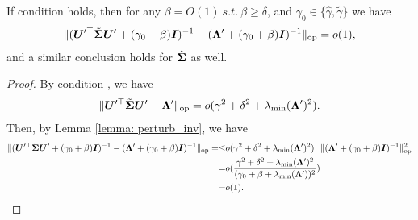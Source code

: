 \begin{lemma}\label{lemma: concentration_inv}
If condition \conc{} holds, then for any $\beta=O(1)~s.t.~\beta\geq \delta$, and $\gamma_0\in\{ \hat{\gamma}, \tilde{\gamma} \}$ we have
    \begin{align}
    \nonumber
     \lVert    ({\bm{U}}'^\top\tilde{{\bm{\Sigma}}} {\bm{U}}' +(\gamma_0+\beta){\bm{I}} )^{-1}-  ({\bm{\Lambda}}' +(\gamma_0+\beta){\bm{I}} )^{-1}  \rVert_{\mathrm{op}}=o(1),
    \end{align}
    and a similar conclusion holds for $\hat{{\bm{\Sigma}}}$ as well.
\end{lemma}
\begin{proof}
By condition \conc{}, we have
\begin{align}
\nonumber
\lVert    {\bm{U}}'^\top\tilde{{\bm{\Sigma}}} {\bm{U}}' -  {\bm{\Lambda}}'   \rVert_{\mathrm{op}}
  = o(\gamma^2 +\delta^2 + \lambda_{\text{min}} ( {\bm{\Lambda}}' )^2 ).
\end{align}
Then, by Lemma \ref{lemma: perturb_inv}, we have
\begin{align}
    \nonumber
    \lVert    ({\bm{U}}'^\top\tilde{{\bm{\Sigma}}} {\bm{U}}' +(\gamma_0+\beta){\bm{I}} )^{-1}-  ({\bm{\Lambda}}' +(\gamma_0+\beta){\bm{I}} )^{-1}  \rVert_{\mathrm{op}} =
    \leq & o(\gamma^2 +\delta^2 + \lambda_{\text{min}} ({\bm{\Lambda}}' )^2 )~~ \lVert ({\bm{\Lambda}}' +(\gamma_0+\beta){\bm{I}} )^{-1} \rVert_{\mathrm{op}}^2 \\
    \nonumber
    =& 
    o( \frac{\gamma^2 +\delta^2 + \lambda_{\text{min}} ({\bm{\Lambda}}' )^2 }{ ( \gamma_0 +\beta + \lambda_{\text{min}} ({\bm{\Lambda}}' )  )^2 } )\\
    \nonumber
    = & o(1).
\end{align}
\end{proof}

